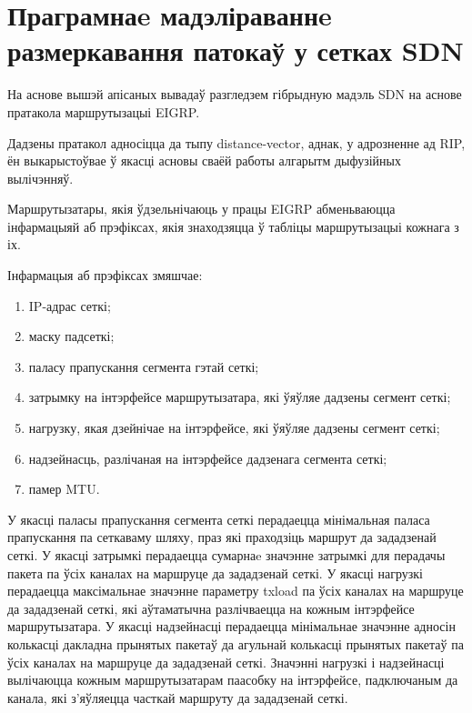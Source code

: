 \section{Праграмнаe мадэліраваннe размеркавання патокаў у сетках SDN}

На аснове вышэй апісаных вывадаў разгледзем гібрыдную мадэль SDN
на аснове пратакола маршрутызацыі EIGRP.

Дадзены пратакол адносіцца да тыпу distance-vector, аднак, у адрозненне ад
RIP, ён выкарыстоўвае ў якасці асновы сваёй работы алгарытм дыфузійных вылічэнняў.

Маршрутызатары, якія ўдзельнічаюць у працы EIGRP абменьваюцца інфармацыяй аб прэфіксах, якія знаходзяцца ў табліцы маршрутызацыі кожнага з іх.

Інфармацыя аб прэфіксах змяшчае:
\begin{enumerate}
    \item IP-адрас сеткі;
    \item маску падсеткі;
    \item паласу прапускання сегмента гэтай сеткі;
    \item затрымку на інтэрфейсе маршрутызатара, які ўяўляе дадзены сегмент сеткі;
    \item нагрузку, якая дзейнічае на інтэрфейсе, які ўяўляе дадзены сегмент сеткі;
    \item надзейнасць, разлічаная на інтэрфейсе дадзенага сегмента сеткі;
    \item памер MTU.
\end{enumerate}

У якасці паласы прапускання сегмента сеткі перадаецца мінімальная
паласа прапускання па сеткаваму шляху, праз які праходзіць маршрут да зададзенай сеткі. У якасці затрымкі перадаецца сумарнаe значэнне затрымкі
для перадачы пакета па ўсіх каналах на маршруце да зададзенай сеткі. У якасці нагрузкі перадаецца максімальнае значэнне параметру txload па ўсіх каналах на маршруце да зададзенай сеткі, які аўтаматычна разлічваецца
на кожным інтэрфейсе маршрутызатара. У якасці надзейнасці перадаецца мінімальнае
значэнне адносін колькасці дакладна прынятых пакетаў да агульнай колькасці прынятых пакетаў па ўсіх каналах на маршруце да зададзенай сеткі. Значэнні
нагрузкі і надзейнасці вылічаюцца кожным маршрутызатарам паасобку
на інтэрфейсе, падключаным да канала, які з'яўляецца часткай маршруту
да зададзенай сеткі.

